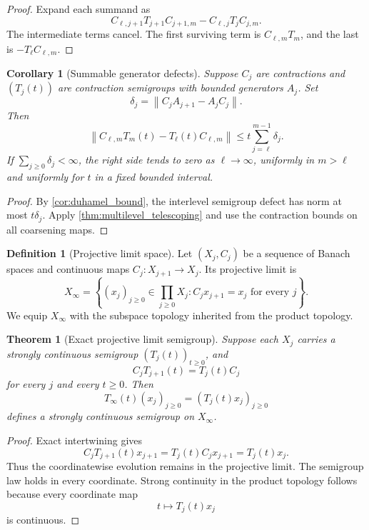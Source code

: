 \documentclass{aomart}
\newtheorem{theorem}{Theorem}[section]
\newtheorem{corollary}[corollary]{Corollary}
\theoremstyle{definition}
\newtheorem{definition}[definition]{Definition}
\theoremstyle{remark}
\newcommand{\norm}[1]{\left\lVert#1\right\rVert}
\begin{document}
\begin{proof}
Expand each summand as
\[
C_{\ell,j+1}T_{j+1}C_{j+1,m}
-
C_{\ell,j}T_jC_{j,m}.
\]
The intermediate terms cancel. The first surviving term is \(C_{\ell,m}T_m\), and the last is \(-T_\ell C_{\ell,m}\).
\end{proof}

\begin{corollary}[Summable generator defects]\label{cor:summable_defects}
Suppose \(C_j\) are contractions and \((T_j(t))\) are contraction semigroups with bounded generators \(A_j\). Set
\[
\delta_j=\norm{C_jA_{j+1}-A_jC_j}.
\]
Then
\[
\norm{C_{\ell,m}T_m(t)-T_\ell(t)C_{\ell,m}}
\leq
 t\sum_{j=\ell}^{m-1}\delta_j.
\]
If \(\sum_{j\geq0}\delta_j<\infty\), the right side tends to zero as \(\ell\to\infty\), uniformly in \(m>\ell\) and uniformly for \(t\) in a fixed bounded interval.
\end{corollary}

\begin{proof}
By \cref{cor:duhamel_bound}, the interlevel semigroup defect has norm at most \(t\delta_j\). Apply \cref{thm:multilevel_telescoping} and use the contraction bounds on all coarsening maps.
\end{proof}

\begin{definition}[Projective limit space]\label{def:projective_limit}
Let \((X_j,C_j)\) be a sequence of Banach spaces and continuous maps \(C_j:X_{j+1}\to X_j\). Its projective limit is
\[
X_\infty
=
\left\{
(x_j)_{j\geq0}\in\prod_{j\geq0}X_j:
C_jx_{j+1}=x_j\text{ for every }j
\right\}.
\]
We equip \(X_\infty\) with the subspace topology inherited from the product topology.
\end{definition}

\begin{theorem}[Exact projective limit semigroup]\label{thm:projective_limit_semigroup}
Suppose each \(X_j\) carries a strongly continuous semigroup \((T_j(t))_{t\geq0}\), and
\[
C_jT_{j+1}(t)=T_j(t)C_j
\]
for every \(j\) and every \(t\geq0\). Then
\[
T_\infty(t)(x_j)_{j\geq0}
=
(T_j(t)x_j)_{j\geq0}
\]
defines a strongly continuous semigroup on \(X_\infty\).
\end{theorem}

\begin{proof}
Exact intertwining gives
\[
C_jT_{j+1}(t)x_{j+1}
=
T_j(t)C_jx_{j+1}
=
T_j(t)x_j.
\]
Thus the coordinatewise evolution remains in the projective limit. The semigroup law holds in every coordinate. Strong continuity in the product topology follows because every coordinate map
\[
t\longmapsto T_j(t)x_j
\]
is continuous.
\end{proof}
\end{document}
